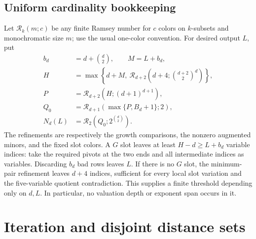 \documentclass[11pt]{article}
\theoremstyle{definition}
\theoremstyle{remark}
\newcommand{\Ram}{\mathcal R}
\begin{document}
\subsection{Uniform cardinality bookkeeping}\label{subsec:ramsey}
Let $\Ram_k(m;c)$ be any finite Ramsey number for $c$ colors on
$k$-subsets and monochromatic size $m$; use the usual one-color
convention. For desired output $L$, put
\begin{align*}
 b_d&=d+\binom d2,\qquad M=L+b_d,\\
 H&=\max\left\{d+M,\ \Ram_{d+2}
       \left(d+4;\binom{d+2}{2}^{d}\right)\right\},\\
 P&=\Ram_{d+2}\left(H;(d+1)^{d+1}\right),\\
 Q_0&=\Ram_{d+1}\left(\max\{P,B_d+1\};2\right),\\
 N_d(L)&=\Ram_2\left(Q_0;2^{\binom d2}\right).
\end{align*}
The refinements are respectively the growth comparisons, the nonzero
augmented minors, and the fixed slot colors. A $G$ slot leaves at
least $H-d\ge L+b_d$ variable indices: take the required pivots at
the two ends and all intermediate indices as variables. Discarding
$b_d$ bad rows leaves $L$. If there is no $G$ slot, the minimum-pair
refinement leaves $d+4$ indices, sufficient for every local slot
variation and the five-variable quotient contradiction. This supplies
a finite threshold depending only on $d,L$. In particular, no valuation
depth or exponent span occurs in it.

\section{Iteration and disjoint distance sets}
\end{document}
